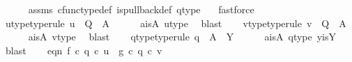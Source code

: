 \begin{isabellebody}
\ \ \ \ \isamarkupfalse%
\ assms{\isacharparenleft}{\kern0pt}{}{\isacharparenright}{\kern0pt}\ cfunc{\isacharunderscore}{\kern0pt}type{\isacharunderscore}{\kern0pt}def\ is{\isacharunderscore}{\kern0pt}pullback{\isacharunderscore}{\kern0pt}def\ q{}{\isacharunderscore}{\kern0pt}type\ \ \isamarkupfalse%
\ fastforce\isanewline
\ \ \isamarkupfalse%
\ u{\isacharunderscore}{\kern0pt}type{}{\isacharbrackleft}{\kern0pt}type{\isacharunderscore}{\kern0pt}rule{\isacharbrackright}{\kern0pt}{\isacharcolon}{\kern0pt}\ {\isachardoublequoteopen}u\ {\isacharcolon}{\kern0pt}\ Q\ {\isasymrightarrow}\ A{\isachardoublequoteclose}\isanewline
\ \ \ \ \isamarkupfalse%
\ a{\isacharunderscore}{\kern0pt}is{\isacharunderscore}{\kern0pt}A\ u{\isacharunderscore}{\kern0pt}type\ \isamarkupfalse%
\ blast\isanewline
\ \ \isamarkupfalse%
\ v{\isacharunderscore}{\kern0pt}type{}{\isacharbrackleft}{\kern0pt}type{\isacharunderscore}{\kern0pt}rule{\isacharbrackright}{\kern0pt}{\isacharcolon}{\kern0pt}\ {\isachardoublequoteopen}v\ {\isacharcolon}{\kern0pt}\ Q\ {\isasymrightarrow}\ A{\isachardoublequoteclose}\isanewline
\ \ \ \ \isamarkupfalse%
\ a{\isacharunderscore}{\kern0pt}is{\isacharunderscore}{\kern0pt}A\ v{\isacharunderscore}{\kern0pt}type\ \isamarkupfalse%
\ blast\isanewline
\ \ \isamarkupfalse%
\ q{}{\isacharunderscore}{\kern0pt}type{}{\isacharbrackleft}{\kern0pt}type{\isacharunderscore}{\kern0pt}rule{\isacharbrackright}{\kern0pt}{\isacharcolon}{\kern0pt}\ {\isachardoublequoteopen}q{}\ {\isacharcolon}{\kern0pt}\ A\ {\isasymrightarrow}\ Y{\isachardoublequoteclose}\isanewline
\ \ \ \ \isamarkupfalse%
\ a{\isacharunderscore}{\kern0pt}is{\isacharunderscore}{\kern0pt}A\ q{}{\isacharunderscore}{\kern0pt}type\ y{\isacharunderscore}{\kern0pt}is{\isacharunderscore}{\kern0pt}Y\ \isamarkupfalse%
\ blast\isanewline
\isanewline
\ \ \isamarkupfalse%
\ eqn{}{\isacharcolon}{\kern0pt}\ {\isachardoublequoteopen}f\ {\isasymcirc}\isactrlsub c\ {\isacharparenleft}{\kern0pt}q{}\ {\isasymcirc}\isactrlsub c\ u{\isacharparenright}{\kern0pt}\ {\isacharequal}{\kern0pt}\ g\ {\isasymcirc}\isactrlsub c\ {\isacharparenleft}{\kern0pt}q{}\ {\isasymcirc}\isactrlsub c\ v{\isacharparenright}{\kern0pt}{\isachardoublequoteclose}\isanewline
\ \ \isamarkupfalse%
\ {\isacharminus}{\kern0pt}\ \isanewline

\end{isabellebody}
